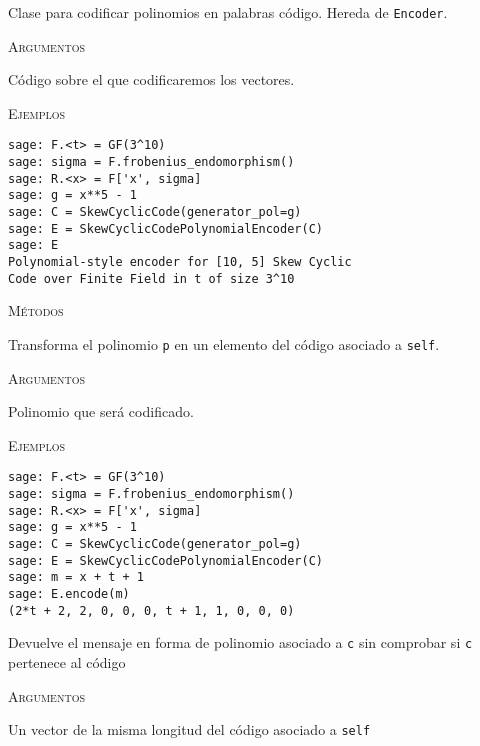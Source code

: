 \begin{description}[font=\ttfamily, style=nextline]
    \item[class SkewCyclicCodePolynomialEncoder(self, code)]
    Clase para codificar polinomios en palabras código. Hereda de \texttt{Encoder}.

    \textsc{Argumentos}
    \begin{description}[font=\ttfamily, style=nextline]
        \item[code]
        Código sobre el que codificaremos los vectores.
    \end{description}

    \textsc{Ejemplos}
    \begin{lstlisting}
sage: F.<t> = GF(3^10)
sage: sigma = F.frobenius_endomorphism()
sage: R.<x> = F['x', sigma]
sage: g = x**5 - 1
sage: C = SkewCyclicCode(generator_pol=g)
sage: E = SkewCyclicCodePolynomialEncoder(C)
sage: E
Polynomial-style encoder for [10, 5] Skew Cyclic
Code over Finite Field in t of size 3^10
    \end{lstlisting}

    \textsc{Métodos}
    \begin{description}[font=\ttfamily, style=nextline]
        \item[encode(self, p)]
        Transforma el polinomio \texttt{p} en un elemento del código asociado a \texttt{self}.

        \textsc{Argumentos}
        \begin{description}[font=\ttfamily, style=nextline]
            \item[p]
            Polinomio que será codificado.
        \end{description}

        \textsc{Ejemplos}
        \begin{lstlisting}
sage: F.<t> = GF(3^10)
sage: sigma = F.frobenius_endomorphism()
sage: R.<x> = F['x', sigma]
sage: g = x**5 - 1
sage: C = SkewCyclicCode(generator_pol=g)
sage: E = SkewCyclicCodePolynomialEncoder(C)
sage: m = x + t + 1
sage: E.encode(m)
(2*t + 2, 2, 0, 0, 0, t + 1, 1, 0, 0, 0)
        \end{lstlisting}

        \item[unencode\_nocheck(self, c)]
        Devuelve el mensaje en forma de polinomio asociado a \texttt{c} sin comprobar si \texttt{c} pertenece al código

        \textsc{Argumentos}
        \begin{description}[font=\ttfamily, style=nextline]
            \item[c]
            Un vector de la misma longitud del código asociado a \texttt{self}
        \end{description}


\end{description}
\end{description}
